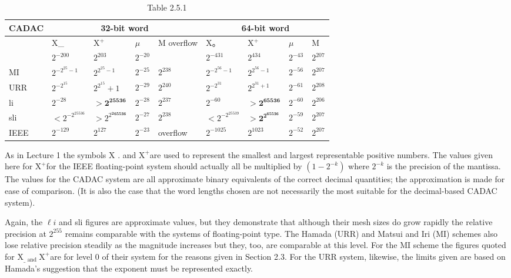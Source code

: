 \documentclass[10pt]{article}
\begin{document}
\begin{table}[h]
\begin{center}
\captionsetup{labelformat=empty}
\caption{Table 2.5.1}
\begin{tabular}{|l|l|l|l|l|l|l|l|l|}
\hline
\multirow[b]{3}{*}{CADAC} & \multicolumn{4}{|c|}{32-bit word} & \multicolumn{4}{|c|}{64-bit word} \\
\hline
 & X\_ & $\mathrm{X}^{+}$ & $\mu$ & M overflow & X。 & $\mathrm{X}^{+}$ & $\mu$ & M \\
\hline
 & $2^{-200}$ & $2^{203}$ & $2^{-20}$ &  & $2^{-431}$ & $2^{434}$ & $2^{-43}$ & $2^{207}$ \\
\hline
MI & $2^{-2^{25}-1}$ & $2^{2^{25}-1}$ & $2^{-25}$ & $2^{238}$ & $2^{-2^{56}-1}$ & $2^{2^{56}-1}$ & $2^{-56}$ & $2^{207}$ \\
\hline
URR & $2^{-2^{15}}$ & $2^{2^{15}}+1$ & $2^{-29}$ & $2^{240}$ & $2^{-2^{31}}$ & $2^{2^{31}+1}$ & $2^{-61}$ & $2^{208}$ \\
\hline
li & $2^{-28}$ & $\boldsymbol{>} \mathbf{2}^{\mathbf{2 5 5 3 6}}$ & $2^{-28}$ & $2^{237}$ & $2^{-60}$ & $\boldsymbol{>} \mathbf{2}^{\mathbf{6 5 5 3 6}}$ & $2^{-60}$ & $2^{206}$ \\
\hline
sli & $<2^{-2^{25536}}$ & $>2^{2^{\mathbf{2}}{ }^{\mathbf{6 5 5 3 6}}}$ & $2^{-27}$ & $2^{238}$ & $<2^{-2^{25539}}$ & $\boldsymbol{>} \mathbf{2}^{\mathbf{2}^{\mathbf{6 5 5 3 6}}}$ & $2^{-59}$ & $2^{207}$ \\
\hline
IEEE & $2^{-129}$ & $2^{127}$ & $2^{-23}$ & overflow & $2^{-1025}$ & $2^{1023}$ & $2^{-52}$ & $2^{207}$ \\
\hline
\end{tabular}
\end{center}
\end{table}

As in Lecture 1 the symbols X . and $\mathrm{X}^{+}$are used to represent the smallest and largest representable positive numbers. The values given here for $\mathrm{X}^{+}$for the IEEE floating-point system should actually all be multiplied by $\left(1-2^{-k}\right)$ where $2^{-k}$ is the precision of the mantissa. The values for the CADAC system are all approximate binary equivalents of the correct decimal quantities; the approximation is made for ease of comparison. (It is also the case that the word lengths chosen are not necessarily the most suitable for the decimal-based CADAC system).

Again, the $\ell i$ and sli figures are approximate values, but they demonstrate that although their mesh sizes do grow rapidly the relative precision at $2^{255}$ remains comparable with the systems of floating-point type. The Hamada (URR) and Matsui and Iri (MI) schemes also lose relative precision steadily as the magnitude increases but they, too, are comparable at this level. For the MI scheme the figures quoted for $\mathrm{X}_{\text {_ and }} \mathrm{X}^{+}$are for level 0 of their system for the reasons given in Section 2.3. For the URR system, likewise, the limits given are based on Hamada's suggestion that the exponent must be represented exactly.
\end{document}
